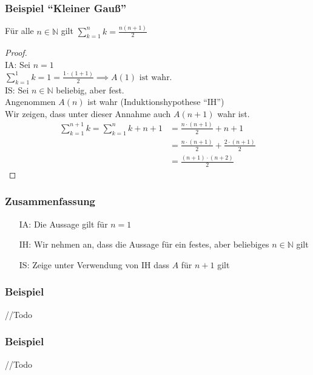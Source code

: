 \documentclass{article}
\begin{document}
    \subsubsection{Beispiel \enquote{Kleiner Gauß}}
      Für alle $n \in \mathbb{N}$ gilt $\displaystyle\sum_{k=1}^{n} k = \frac{n(n+1)}{2}$
      \begin{proof} \mbox{} \\
        IA: Sei $n = 1$ \\
        $\displaystyle\sum_{k=1}^{1} k = 1 = \frac{1 \cdot (1+1)}{2} \implies A(1) \text{ ist wahr.}$ \\
        IS: Sei $n \in \mathbb{N}$ beliebig, aber fest. \\
        Angenommen $A(n)$ ist wahr (Induktionshypothese \enquote{IH}) \\
        Wir zeigen, dass unter dieser Annahme auch $A(n+1)$ wahr ist.
        \begin{align*}
          \displaystyle\sum_{k=1}^{n+1} k = \displaystyle\sum_{k=1}^{n} k + n+1
          &= \frac{n \cdot (n+1)}{2} + n+1 \\
          &= \frac{n \cdot (n+1)}{2} + \frac{2 \cdot (n+1)}{2} \\
          &=\frac{(n+1) \cdot (n+2)}{2}
        \end{align*}
      \end{proof}

    \subsubsection{Zusammenfassung}
      \begin{itemize}
        \item [IA:] Die Aussage gilt für $n=1$
        \item [IH:] Wir nehmen an, dass die Aussage für ein festes, aber
          beliebiges $n \in \mathbb{N}$ gilt
        \item [IS:] Zeige unter Verwendung von IH dass $A$ für $n+1$ gilt
      \end{itemize}

    \subsubsection{Beispiel}
      //Todo

    \subsubsection{Beispiel}
      //Todo
\end{document}
